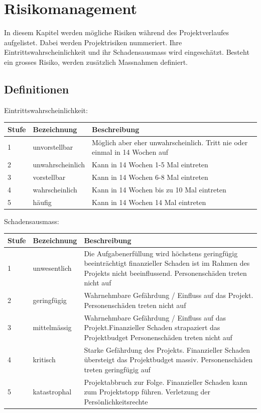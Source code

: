 \documentclass[a4paper]{report}
\begin{document}
\section{Risikomanagement}
\label{ch:RisikoMgmt}
In diesem Kapitel werden mögliche Risiken während des Projektverlaufes aufgelistet. Dabei werden Projektrisiken nummeriert. Ihre Eintrittswahrscheinlichkeit und ihr Schadensausmass wird eingeschätzt. Besteht ein grosses Risiko, werden zusätzlich Massnahmen definiert.

\subsection{Definitionen}
\label{sec:Def}
\vspace{1em}
\noindent
Eintrittswahrscheinlichkeit:

\vspace{1em}
\noindent
\begin{tabular}{|p{}|p{}|p{}|}
	\hline
	\textbf{Stufe} & \textbf{Bezeichnung} & \textbf{Beschreibung} \\
	\hline
	1 & unvorstellbar & Möglich aber eher unwahrscheinlich. Tritt nie oder einmal in 14 Wochen auf \\
	\hline
	2 & unwahrscheinlich & Kann in 14 Wochen 1-5 Mal eintreten\\
	\hline
	3 & vorstellbar & Kann in 14 Wochen 6-8 Mal eintreten \\
	\hline
	4 & wahrscheinlich & Kann in 14 Wochen bis zu 10 Mal eintreten \\
	\hline
	5 & häufig & Kann in 14 Wochen 14 Mal eintreten\\
	\hline
\end{tabular}

\vspace{1em}
\noindent
Schadensausmass:

\vspace{1em}
\noindent
\begin{tabular}{|p{}|p{}|p{}|}
	\hline
	\textbf{Stufe} & \textbf{Bezeichnung} & \textbf{Beschreibung} \\
	\hline
	1 & unwesentlich & Die Aufgabenerfüllung wird höchstens geringfügig beeinträchtigt finanzieller Schaden ist im Rahmen des Projekts nicht beeinflussend. Personenschäden treten nicht auf \\
	\hline
	2 & geringfügig & Wahrnehmbare Gefährdung / Einfluss auf das Projekt. Personenschäden treten nicht auf \\
	\hline
	3 & mittelmässig & Wahrnehmbare Gefährdung / Einfluss auf das Projekt.Finanzieller Schaden strapaziert das Projektbudget
	Personenschäden treten nicht auf \\
	\hline
	4 & kritisch & Starke Gefährdung des Projekts. Finanzieller Schaden übersteigt das Projektbudget massiv. Personenschäden treten geringfügig auf \\
	\hline
	5 & katastrophal & Projektabbruch zur Folge. Finanzieller Schaden kann zum Projektstopp führen. Verletzung der Persönlichkeitsrechte
	\\
	\hline
\end{tabular}
\end{document}
